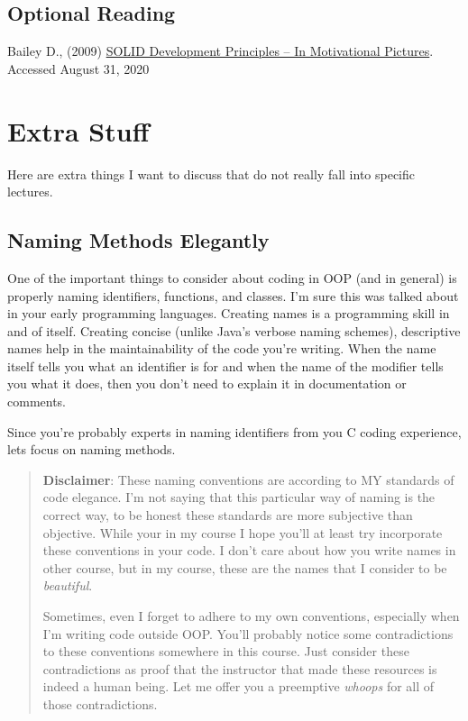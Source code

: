 \section{Optional Reading}\label{solid-objects.md__optional-reading}

Bailey D., (2009)
\href{https://lostechies.com/derickbailey/2009/02/11/solid-development-principles-in-motivational-pictures/}{SOLID
Development Principles -- In Motivational Pictures}. Accessed August 31,
2020

\chapter{Extra Stuff}\label{extra-stuff.md__extra-stuff}

Here are extra things I want to discuss that do not really fall into
specific lectures.

\section{Naming Methods
Elegantly}\label{extra-stuff.md__naming-methods-elegantly}

One of the important things to consider about coding in OOP (and in
general) is properly naming identifiers, functions, and classes. I'm
sure this was talked about in your early programming languages. Creating
names is a programming skill in and of itself. Creating concise (unlike
Java's verbose naming schemes), descriptive names help in the
maintainability of the code you're writing. When the name itself tells
you what an identifier is for and when the name of the modifier tells
you what it does, then you don't need to explain it in documentation or
comments.

Since you're probably experts in naming identifiers from you C coding
experience, lets focus on naming methods.

\begin{quote}
\textbf{Disclaimer}: These naming conventions are according to MY
standards of code elegance. I'm not saying that this particular way of
naming is the correct way, to be honest these standards are more
subjective than objective. While your in my course I hope you'll at
least try incorporate these conventions in your code. I don't care about
how you write names in other course, but in my course, these are the
names that I consider to be \emph{beautiful}.

Sometimes, even I forget to adhere to my own conventions, especially
when I'm writing code outside OOP. You'll probably notice some
contradictions to these conventions somewhere in this course. Just
consider these contradictions as proof that the instructor that made
these resources is indeed a human being. Let me offer you a preemptive
\emph{whoops} for all of those contradictions.
\end{quote}

